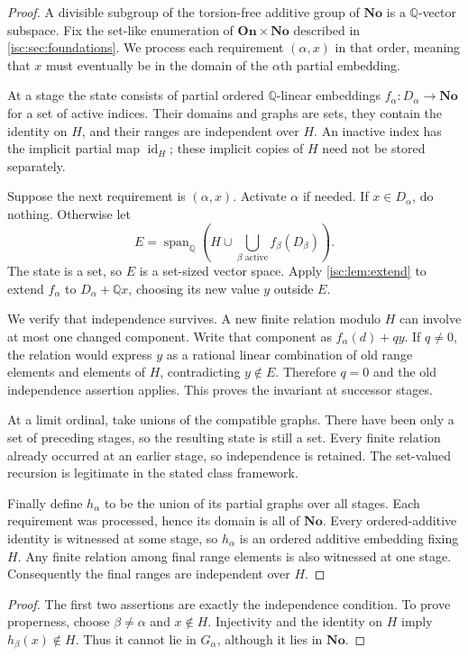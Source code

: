 \documentclass[11pt,letterpaper]{article}
\newtheorem{corollary}[theorem]{Corollary}
\theoremstyle{definition}
\theoremstyle{remark}
\newcommand{\No}{\mathbf{No}}
\newcommand{\On}{\mathbf{On}}
\newcommand{\Q}{\mathbb Q}
\newcommand{\Span}{\operatorname{span}_{\Q}}
\newcommand{\id}{\operatorname{id}}
\numberwithin{equation}{section}
\begin{document}
\begin{proof}
A divisible subgroup of the torsion-free additive group of $\No$ is a
$\Q$-vector subspace. Fix the set-like enumeration of $\On\times\No$
described in \cref{isc:sec:foundations}. We process each requirement $(\alpha,x)$
in that order, meaning that $x$ must eventually be in the domain of the
$\alpha$th partial embedding.

At a stage the state consists of partial ordered $\Q$-linear embeddings
$f_\alpha:D_\alpha\to\No$ for a set of active indices. Their domains and
graphs are sets, they contain the identity on $H$, and their ranges are
independent over $H$. An inactive index has the implicit partial map
$\id_H$; these implicit copies of $H$ need not be stored separately.

Suppose the next requirement is $(\alpha,x)$. Activate $\alpha$ if needed.
If $x\in D_\alpha$, do nothing. Otherwise let
\[
 E=\Span\left(H\cup
     \bigcup_{\beta\text{ active}}f_\beta(D_\beta)\right).
\]
The state is a set, so $E$ is a set-sized vector space. Apply
\cref{isc:lem:extend} to extend $f_\alpha$ to $D_\alpha+\Q x$, choosing its
new value $y$ outside $E$.

We verify that independence survives. A new finite relation modulo $H$
can involve at most one changed component. Write that component as
$f_\alpha(d)+qy$. If $q\ne0$, the relation would express $y$ as a rational
linear combination of old range elements and elements of $H$, contradicting
$y\notin E$. Therefore $q=0$ and the old independence assertion applies.
This proves the invariant at successor stages.

At a limit ordinal, take unions of the compatible graphs. There have been
only a set of preceding stages, so the resulting state is still a set.
Every finite relation already occurred at an earlier stage, so independence
is retained. The set-valued recursion is legitimate in the stated class
framework.

Finally define $h_\alpha$ to be the union of its partial graphs over all
stages. Each requirement was processed, hence its domain is all of $\No$.
Every ordered-additive identity is witnessed at some stage, so $h_\alpha$
is an ordered additive embedding fixing $H$. Any finite relation among
final range elements is also witnessed at one stage. Consequently the final
ranges are independent over $H$.
\end{proof}

\begin{proof}
The first two assertions are exactly the independence condition. To prove
properness, choose $\beta\ne\alpha$ and $x\notin H$. Injectivity and the
identity on $H$ imply $h_\beta(x)\notin H$. Thus it cannot lie in
$G_\alpha$, although it lies in $\No$.
\end{proof}
\end{document}
